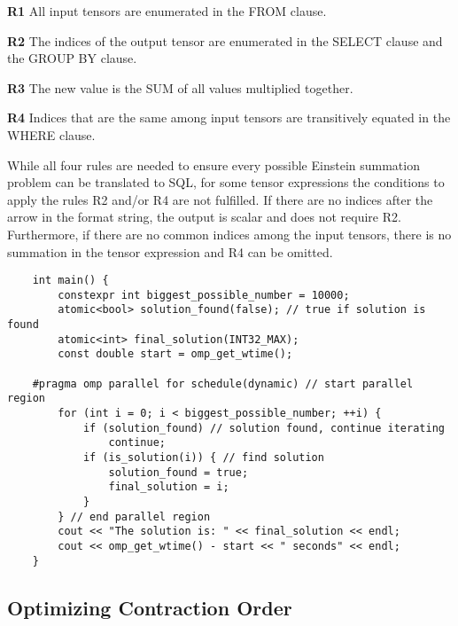 \begin{description}
    \item \textbf{R1} All input tensors are enumerated in the FROM clause.
    \item \textbf{R2} The indices of the output tensor are enumerated in the SELECT clause 
    and the GROUP BY clause.
    \item \textbf{R3} The new value is the SUM of all values multiplied together.
    \item \textbf{R4} Indices that are the same among input tensors are transitively equated 
    in the WHERE clause.
\end{description}
%
While all four rules are needed to ensure every possible Einstein summation problem 
can be translated to SQL, for some tensor expressions the conditions to apply the rules
R2 and/or R4 are not fulfilled. If there are no indices after the arrow in the format 
string, the output is scalar and does not require R2. Furthermore, if there are no common
indices among the input tensors, there is no summation in the tensor expression and R4
can be omitted.

\begin{lstlisting}
    int main() {
        constexpr int biggest_possible_number = 10000;
        atomic<bool> solution_found(false); // true if solution is found
        atomic<int> final_solution(INT32_MAX);
        const double start = omp_get_wtime();

    #pragma omp parallel for schedule(dynamic) // start parallel region
        for (int i = 0; i < biggest_possible_number; ++i) {
            if (solution_found) // solution found, continue iterating
                continue;
            if (is_solution(i)) { // find solution
                solution_found = true;
                final_solution = i;
            }
        } // end parallel region
        cout << "The solution is: " << final_solution << endl;
        cout << omp_get_wtime() - start << " seconds" << endl;
    }
\end{lstlisting}

\subsection{Optimizing Contraction Order}

